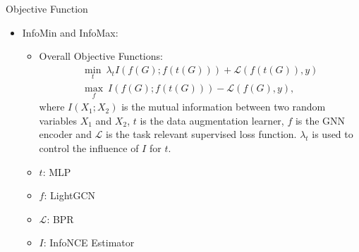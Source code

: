 \documentclass[t]{beamer}
\begin{document}
\begin{frame}[allowframebreaks]{Objective Function}
\begin{itemize}
    \item InfoMin and InfoMax:
    \begin{itemize}
        \item Overall Objective Functions:
        \begin{equation*}
\label{eq:loss_function}
\begin{aligned}
\min_{t}\  \lambda_t I(f(G); f(t(G)))  + \mathcal{L}(f(t(G)), y) \\
\max_{f}\  I(f(G); f(t(G))) - \mathcal{L}(f(G), y),
\end{aligned}
\end{equation*}
where $I(X_1; X_2)$ is the mutual information between two random variables $X_1$ and $X_2$, $t$ is the data augmentation learner, $f$ is the GNN encoder and $\mathcal{L}$ is the task relevant supervised loss function.
$\lambda_t$ is used to control the influence of $I$ for $t$.
\item $t$: MLP 
\item $f$: LightGCN
\item $\mathcal{L}$: BPR 
\item $I$: InfoNCE Estimator
    \end{itemize}



    
\framebreak


\end{itemize}
\end{frame}
\end{document}

